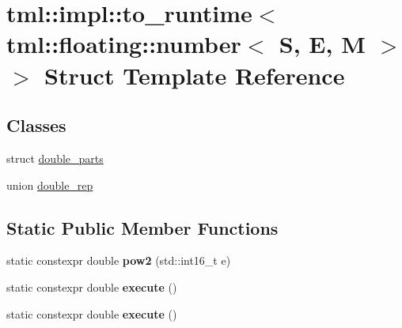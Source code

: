 \hypertarget{structtml_1_1impl_1_1to__runtime_3_01tml_1_1floating_1_1number_3_01S_00_01E_00_01M_01_4_01_4}{\section{tml\+:\+:impl\+:\+:to\+\_\+runtime$<$ tml\+:\+:floating\+:\+:number$<$ S, E, M $>$ $>$ Struct Template Reference}
\label{structtml_1_1impl_1_1to__runtime_3_01tml_1_1floating_1_1number_3_01S_00_01E_00_01M_01_4_01_4}
}
\subsection*{Classes}
\begin{DoxyCompactItemize}
\item 
struct \hyperlink{structtml_1_1impl_1_1to__runtime_3_01tml_1_1floating_1_1number_3_01S_00_01E_00_01M_01_4_01_4_1_1double__parts}{double\+\_\+parts}
\item 
union \hyperlink{uniontml_1_1impl_1_1to__runtime_3_01tml_1_1floating_1_1number_3_01S_00_01E_00_01M_01_4_01_4_1_1double__rep}{double\+\_\+rep}
\end{DoxyCompactItemize}
\subsection*{Static Public Member Functions}
\begin{DoxyCompactItemize}
\item 
\hypertarget{structtml_1_1impl_1_1to__runtime_3_01tml_1_1floating_1_1number_3_01S_00_01E_00_01M_01_4_01_4_a1a8fc4d0bb58dbc1e2e96c48c27a6f62}{static constexpr double {\bfseries pow2} (std\+::int16\+\_\+t e)}\label{structtml_1_1impl_1_1to__runtime_3_01tml_1_1floating_1_1number_3_01S_00_01E_00_01M_01_4_01_4_a1a8fc4d0bb58dbc1e2e96c48c27a6f62}

\item 
\hypertarget{structtml_1_1impl_1_1to__runtime_3_01tml_1_1floating_1_1number_3_01S_00_01E_00_01M_01_4_01_4_acef5fde6f37c0a382797648a003a3d7d}{static constexpr double {\bfseries execute} ()}\label{structtml_1_1impl_1_1to__runtime_3_01tml_1_1floating_1_1number_3_01S_00_01E_00_01M_01_4_01_4_acef5fde6f37c0a382797648a003a3d7d}

\item 
\hypertarget{structtml_1_1impl_1_1to__runtime_3_01tml_1_1floating_1_1number_3_01S_00_01E_00_01M_01_4_01_4_acef5fde6f37c0a382797648a003a3d7d}{static constexpr double {\bfseries execute} ()}\label{structtml_1_1impl_1_1to__runtime_3_01tml_1_1floating_1_1number_3_01S_00_01E_00_01M_01_4_01_4_acef5fde6f37c0a382797648a003a3d7d}

\end{DoxyCompactItemize}
